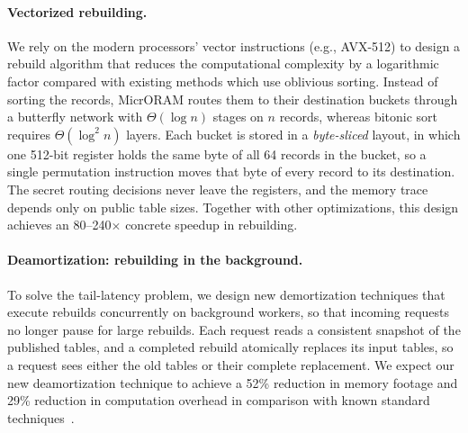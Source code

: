 \paragraph{Vectorized rebuilding.}
We rely on the modern processors' 
vector instructions 
(e.g., AVX-512)
to design a rebuild algorithm that reduces the
computational complexity by a logarithmic factor compared with existing
methods which use oblivious
sorting. Instead of sorting the records, MicrORAM routes them to their
destination buckets through a butterfly network with $\Theta(\log n)$
stages on $n$ records, whereas bitonic sort~\cite{bitonicsort} requires
$\Theta(\log^2 n)$ layers. Each bucket is stored in a \emph{byte-sliced}
layout, in which one 512-bit register holds the same byte of all 64 records
in the bucket, so a single permutation instruction moves that byte of every
record to its destination. The secret routing decisions never leave the
registers, and the memory trace depends only on public table sizes.
Together with other optimizations, this design achieves an
80--240$\times$ concrete speedup in rebuilding.

\paragraph{Deamortization: rebuilding in the background.}
To solve the tail-latency problem, 
we design
new demortization techniques that execute rebuilds
concurrently on background workers, so that incoming requests no longer
pause for large rebuilds. Each request reads a consistent snapshot of the
published tables, and a completed rebuild atomically replaces its input
tables, so a request sees either the old tables or their complete
replacement.
We expect our new deamortization technique
to achieve a 52\% reduction in memory
footage and 29\% reduction 
in computation overhead in comparison
with known standard techniques~\cite{OS97}.

